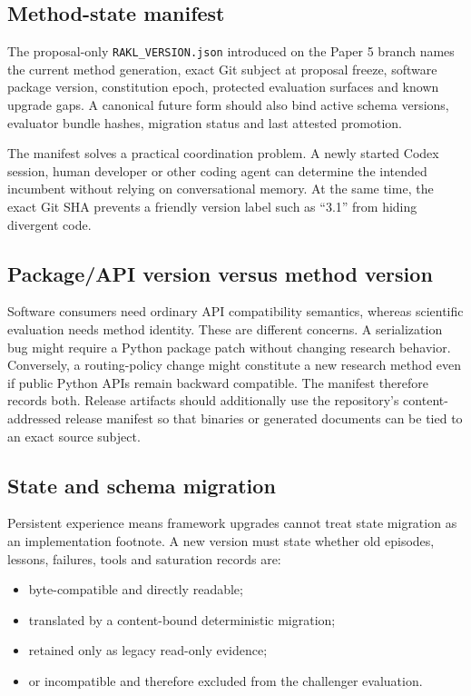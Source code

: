 \subsection{Method-state manifest}

The proposal-only \texttt{RAKL\_VERSION.json} introduced on the Paper 5 branch names the current method generation, exact Git subject at proposal freeze, software package version, constitution epoch, protected evaluation surfaces and known upgrade gaps. A canonical future form should also bind active schema versions, evaluator bundle hashes, migration status and last attested promotion.

The manifest solves a practical coordination problem. A newly started Codex session, human developer or other coding agent can determine the intended incumbent without relying on conversational memory. At the same time, the exact Git SHA prevents a friendly version label such as ``3.1'' from hiding divergent code.

\subsection{Package/API version versus method version}

Software consumers need ordinary API compatibility semantics, whereas scientific evaluation needs method identity. These are different concerns. A serialization bug might require a Python package patch without changing research behavior. Conversely, a routing-policy change might constitute a new research method even if public Python APIs remain backward compatible. The manifest therefore records both. Release artifacts should additionally use the repository's content-addressed release manifest so that binaries or generated documents can be tied to an exact source subject.

\subsection{State and schema migration}

Persistent experience means framework upgrades cannot treat state migration as an implementation footnote. A new version must state whether old episodes, lessons, failures, tools and saturation records are:

\begin{itemize}[leftmargin=*]
\item byte-compatible and directly readable;
\item translated by a content-bound deterministic migration;
\item retained only as legacy read-only evidence;
\item or incompatible and therefore excluded from the challenger evaluation.
\end{itemize}


